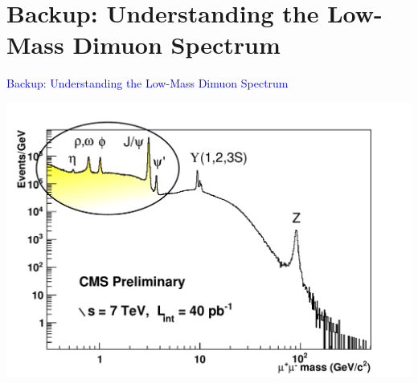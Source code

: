\documentclass[compress]{beamer}
\begin{document}
\section*{Backup: Understanding the Low-Mass Dimuon Spectrum}
\begin{frame}
\vspace{0.75 cm}
\begin{center}
\Huge \textcolor{blue}{Backup: Understanding the Low-Mass Dimuon Spectrum}

\vspace{0.25 cm}
\includegraphics[width=0.75\linewidth]{dimuonSpectrum_40pb-1.pdf}
\end{center}
\end{frame}
\end{document}
